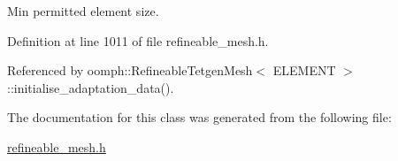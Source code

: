 Min permitted element size. 



Definition at line 1011 of file refineable\+\_\+mesh.\+h.



Referenced by oomph\+::\+Refineable\+Tetgen\+Mesh$<$ E\+L\+E\+M\+E\+N\+T $>$\+::initialise\+\_\+adaptation\+\_\+data().



The documentation for this class was generated from the following file\+:\begin{DoxyCompactItemize}
\item 
\hyperlink{refineable__mesh_8h}{refineable\+\_\+mesh.\+h}\end{DoxyCompactItemize}
